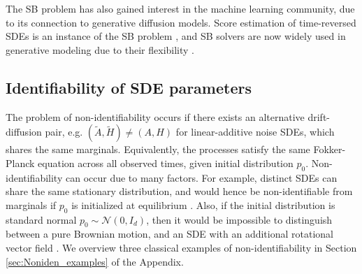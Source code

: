 \documentclass[twoside,11pt]{article}
\begin{document}
The SB problem has also gained interest in the machine learning community, due to its connection to generative diffusion models. Score estimation of time-reversed SDEs is an instance of the SB problem \citep{de2021diffusion}, and SB solvers are now widely used in generative modeling due to their flexibility \citep{de2021diffusion, chen2021likelihood, shi2024diffusion, huang2024one}. 

\subsection{Identifiability of SDE parameters}
The problem of non-identifiability occurs if there exists an alternative drift-diffusion pair, e.g. $(\tilde{A}, \tilde{H}) \neq (A, H)$ for linear-additive noise SDEs, which shares the same marginals. Equivalently, the processes satisfy the same Fokker-Planck equation across all observed times, given initial distribution $p_0$. Non-identifiability can occur due to many factors. For example, distinct SDEs can share the same stationary distribution, and would hence be non-identifiable from marginals if $p_0$ is initialized at equilibrium \citep{lavenant2021towards, shen2024learning}. Also, if the initial distribution is standard normal $p_0 \sim \mathcal{N}(0, I_d)$, then it would be impossible to distinguish between a pure Brownian motion, and an SDE with an additional rotational vector field \citep{shen2024learning}. We  overview three classical examples of non-identifiability in Section \ref{sec:Noniden_examples} of the Appendix.
\end{document}
